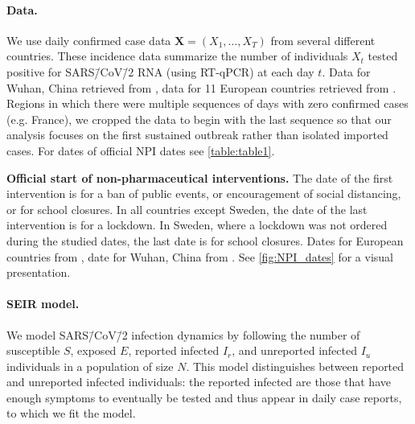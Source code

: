 \documentclass[12pt]{extarticle}
\let\vec\mathbf
\begin{document}
\paragraph*{Data.} 
We use daily confirmed case data $\vec{X}=(X_1, \ldots, X_T)$ from several different countries. These incidence data summarize the number of individuals $X_t$ tested positive for SARS\=/CoV\=/2 RNA (using RT-qPCR) at each day $t$.
Data for Wuhan, China retrieved from \citet{Pei2020}, data for 11 European countries retrieved from \citet{Flaxman2020}. 
Regions in which there were multiple sequences of days with zero confirmed cases (e.g. France), we cropped the data to begin with the last sequence so that our analysis focuses on the first sustained outbreak rather than isolated imported cases. 
For dates of official NPI dates see \autoref{table:table1}.


 
\begin{table}[h]
\centering
{}
\caption{
\textbf{Official start of non-pharmaceutical interventions.}
The date of the first intervention is for a ban of public events, or encouragement of social distancing, or for school closures.
In all countries except Sweden, the date of the last intervention is for a lockdown. In Sweden, where a lockdown was not ordered during the studied dates, the last date is for school closures. Dates for European countries from \citet{Flaxman2020}, date for Wuhan, China from \citet{Pei2020}. See \autoref{fig:NPI_dates} for a visual presentation.
}
\label{table:table1}
\end{table}



\paragraph*{SEIR model.} \label{sec:model}
We model SARS\=/CoV\=/2 infection dynamics by following the number of susceptible $S$, exposed $E$, reported infected $I_r$, and unreported infected $I_u$ individuals in a population of size $N$.
This model distinguishes between reported and unreported infected individuals: the reported infected are those that have enough symptoms to eventually be tested and thus appear in daily case reports, to which we fit the model.
\end{document}

